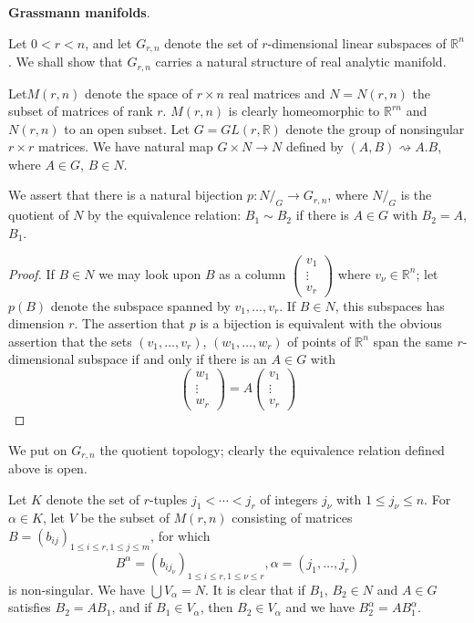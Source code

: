 \medskip
\noindent
\textbf{Grassmann manifolds}.

Let $0 <  r  < n$, and let $G_{r, n} $ denote the set of
$r$-dimensional linear subspaces of $\mathbb{R}^n$. We shall show
that $G_{r, n}$ carries a natural structure of real analytic
manifold. 

Let\pageoriginale $M(r, n)$ denote the space of $r \times n$ real matrices and $N =
N(r, n)$ the subset of matrices of rank $r$. $M(r, n)$ is clearly
homeomorphic to $\mathbb{R}^{rn}$ and $N(r, n)$ to an open subset. Let
$G= GL(r, \mathbb{R})$ denote the group of nonsingular $r \times r$
matrices. We have  natural map $G \times N \to N$ defined  by $(A, B)
\rightsquigarrow A.B$, where $A \in G$, $B \in N$. 

We assert that there is a natural bijection $p:  N /_{G} \to G_{r,
  n}$, where $N/_{G}$ is the quotient of  $N$ by the equivalence
relation: $B_1 \sim B_2$ if there is $A \in G$ with $B_2 = A$, $B_1$. 

\begin{proof}
  If $B \in N$ we may look upon  $B$ as a column 
  $\begin{pmatrix} v_1 \\ \vdots\\ v_r  \end{pmatrix}$
  where $v_\nu \in \mathbb{R}^n$; let $p(B)$ denote the subspace
  spanned by $v_1, \ldots , v_r$. If $B \in N$, this subspaces  has
  dimension $r$. The assertion that $p$ is a bijection is equivalent
  with the obvious assertion that the sets $(v_1, \ldots , v_r)$, $(w_1,
  \ldots , w_r)$ of points of $\mathbb{R}^n$ span the same
  $r$-dimensional subspace if and only if there is an $A \in G$ with  
  $$
  \begin{pmatrix}
    w_1 \\ \vdots \\ w_r
  \end{pmatrix}    
  =A
  \begin{pmatrix}
    v_1 \\ \vdots \\ v_r
  \end{pmatrix}    
  $$
\end{proof}  

We put on $G_{r, n}$ the quotient topology; clearly the equivalence
relation defined above is open. 

Let $K$ denote the set of $r$-tuples  $j_1 < \cdots < j_r$ of integers
$j_\nu$ with $1 \le j_\nu \le n$. For $\alpha \in K$, let $V$ be the
subset of $M(r, n)$ consisting of matrices $B=(b_{ij})_{1  \le i \le r,
  1 \leq j \leq m}$, for which  
  $$
  B^\alpha = (b_{ij_\nu})_{1 \le i \le r, 1 \le \nu \le r}, \alpha= (j_1, \ldots , j_r)
  $$
  is non-singular. We have $\bigcup V_\alpha =N$. It is clear that if
  $B_1$, $ B_2 \in N$ and  $A \in G$\pageoriginale satisfies $B_2= A B_1$, and if $B_1
  \in V_\alpha$, then $B_2 \in V_\alpha$ and we have $B^\alpha_2=
  AB^\alpha_1$. 

